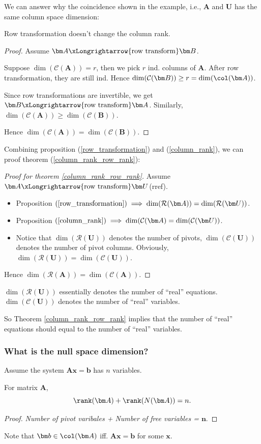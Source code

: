 We can answer why the coincidence shown in the example, i.e., $\bm A$ and $\bm U$ has the same column space dimension:
\begin{proposition}\label{column_rank}
Row transformation doesn't change the column rank.
\end{proposition}
\begin{proof}
Assume $\bm A\xLongrightarrow{\text{row transform}}\bm B$.

Suppose $\dim(\mathcal{C}(\bm A)) = r$, then we pick $r$ ind. columns of $\bm A$. After row transformation, they are still ind. Hence $\dim(\mathcal{C}(\bm B))\ge r = \dim(\col(\bm A))$.

Since row transformations are invertible, we get $\bm B\xLongrightarrow{\text{row transform}}\bm A$. Similarly, $\dim(\mathcal{C}(\bm A))\ge \dim(\mathcal{C}(\bm B))$.

Hence $\dim(\mathcal{C}(\bm A))= \dim(\mathcal{C}(\bm B))$.
\end{proof}
Combining proposition (\ref{row_transformation}) and (\ref{column_rank}), we can proof theorem (\ref{column_rank_row_rank}):
\begin{proof}[Proof for theorem \ref{column_rank_row_rank}]
Assume $\bm A\xLongrightarrow{\text{row transform}}\bm U$(rref).
\begin{itemize}
\item
Proposition $(\text{\ref{row_transformation}})\implies \dim(\mathcal{R}(\bm A)) = \dim(\mathcal{R}(\bm U))$.
\item
Proposition $(\text{\ref{column_rank}})\implies \dim(\mathcal{C}(\bm A) = \dim(\mathcal{C}(\bm U))$.
\item
Notice that $\dim(\mathcal{R}(\bm U))$ denotes the number of pivots, $\dim(\mathcal{C}(\bm U))$ denotes the number of pivot columns. Obviously, $\dim(\mathcal{R}(\bm U))=\dim(\mathcal{C}(\bm U))$.
\end{itemize}
Hence $\dim(\mathcal{R}(\bm A))=\dim(\mathcal{C}(\bm A))$.
\end{proof}
\begin{remark}
$\dim(\mathcal{R}(\bm U))$ essentially denotes the number of ``real'' equations. $\dim(\mathcal{C}(\bm U))$ denotes the number of ``real'' variables.

So Theorem \ref{column_rank_row_rank} implies that the number of ``real'' equations should equal to the number of ``real'' variables.
\end{remark}

\subsubsection{What is the null space dimension?}
Assume the system $\bm{Ax}=\bm b$ has $n$ variables.
\begin{proposition}For matrix $\bm A$, 
\[
\rank(\bm A) + \rank(N(\bm A)) = n.
\]
\end{proposition}
\begin{proof}
\emph{Number of pivot varibales + Number of free variables = $\bm n$}.
\end{proof}
Note that $\bm b\in\col(\bm A)$ iff. $\bm{Ax} = \bm b$ for some $\bm x$.

